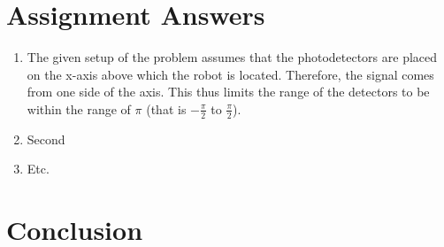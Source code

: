 \documentclass[a4paper,11pt]{article}
\begin{document}
\section*{Assignment Answers}
\begin{enumerate}
  \item The given setup of the problem assumes that the photodetectors are placed on the x-axis above which the robot is located. Therefore, the signal comes from one side of the axis. This thus limits the range of the detectors to be within the range of $\pi$ (that is $-\frac{\pi}{2}$ to $\frac{\pi}{2}$). 
  \item Second
  \item Etc.
\end{enumerate}

\section*{Conclusion}
\end{document}
